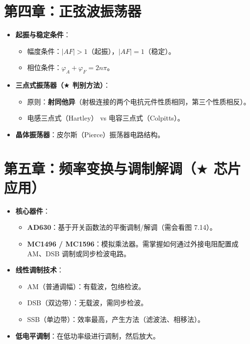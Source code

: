 \documentclass[a4paper,12pt]{ctexart}
\begin{document}
	\section{第四章：正弦波振荡器}
	\begin{itemize}
		\item \textbf{起振与稳定条件}：
		\begin{itemize}
			\item 幅度条件：$|AF| > 1$（起振），$|AF|=1$（稳定）。
			\item 相位条件：$\varphi_A + \varphi_F = 2n\pi$。
		\end{itemize}
		\item \textbf{三点式振荡器（$\bigstar$ 判别方法）}：
		\begin{itemize}
			\item 原则：\textbf{射同他异}（射极连接的两个电抗元件性质相同，第三个性质相反）。
			\item 电感三点式（Hartley） vs 电容三点式（Colpitts）。
		\end{itemize}
		\item \textbf{晶体振荡器}：皮尔斯（Pierce）振荡器电路结构。
	\end{itemize}

	\section{第五章：频率变换与调制解调（$\bigstar$ 芯片应用）}
	\begin{itemize}
		\item \textbf{核心器件}：
		\begin{itemize}
			\item \textbf{AD630}：基于开关函数法的平衡调制/解调（需会看图 7.14）。
			\item \textbf{MC1496 / MC1596}：模拟乘法器。需掌握如何通过外接电阻配置成 AM、DSB 调制或同步检波电路。
		\end{itemize}
		\item \textbf{线性调制技术}：
		\begin{itemize}
			\item AM（普通调幅）：有载波，包络检波。
			\item DSB（双边带）：无载波，需同步检波。
			\item SSB（单边带）：效率最高，产生方法（滤波法、相移法）。
		\end{itemize}
		\item \textbf{低电平调制}：在低功率级进行调制，然后放大。
	\end{itemize}
\end{document}
